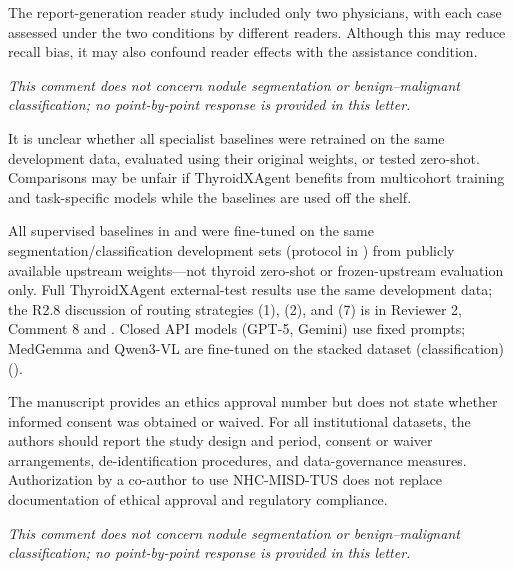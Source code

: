 \begin{reviewercomment}
The report-generation reader study included only two physicians, with each case assessed under the two conditions by different readers. Although this may reduce recall bias, it may also confound reader effects with the assistance condition.
\end{reviewercomment}
\begin{authorresponse}
\noindent\textit{This comment does not concern nodule segmentation or benign--malignant classification; no point-by-point response is provided in this letter.}
\end{authorresponse}

\begin{reviewercomment}
It is unclear whether all specialist baselines were retrained on the same development data, evaluated using their original weights, or tested zero-shot. Comparisons may be unfair if ThyroidXAgent benefits from multicohort training and task-specific models while the baselines are used off the shelf.
\end{reviewercomment}
\begin{authorresponse}
All supervised baselines in  and  were fine-tuned on the same segmentation/classification development sets (protocol in ) from publicly available upstream weights---not thyroid zero-shot or frozen-upstream evaluation only. Full ThyroidXAgent external-test results use the same development data; the R2.8 discussion of routing strategies (1), (2), and (7) is in Reviewer 2, Comment 8 and . Closed API models (GPT-5, Gemini) use fixed prompts; MedGemma and Qwen3-VL are fine-tuned on the stacked dataset (classification) ().\par
\par
\end{authorresponse}

\begin{reviewercomment}
The manuscript provides an ethics approval number but does not state whether informed consent was obtained or waived. For all institutional datasets, the authors should report the study design and period, consent or waiver arrangements, de-identification procedures, and data-governance measures. Authorization by a co-author to use NHC-MISD-TUS does not replace documentation of ethical approval and regulatory compliance.
\end{reviewercomment}
\begin{authorresponse}
\noindent\textit{This comment does not concern nodule segmentation or benign--malignant classification; no point-by-point response is provided in this letter.}
\end{authorresponse}

